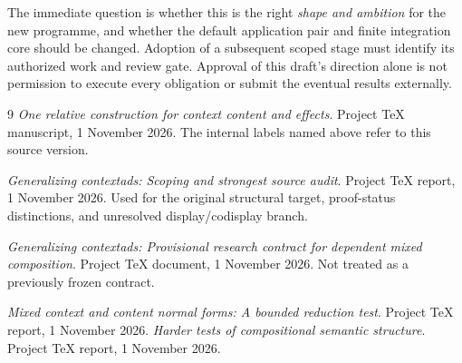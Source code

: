 \documentclass[11pt,a4paper]{article}
\begin{document}
The immediate question is whether this is the right \emph{shape and ambition}
for the new programme, and whether the default application pair and finite
integration core should be changed. Adoption of a subsequent scoped stage
must identify its authorized work and review gate. Approval of this draft's
direction alone is not permission to execute every obligation or submit the
eventual results externally.

\begin{thebibliography}{9}
\emph{One relative construction for context content and effects}.
Project TeX manuscript, 1 November 2026.
The internal labels named above refer to this source version.

\emph{Generalizing contextads: Scoping and strongest source audit}.
Project TeX report, 1 November 2026.
Used for the original structural target, proof-status distinctions, and
unresolved display/codisplay branch.

\emph{Generalizing contextads: Provisional research contract for dependent
mixed composition}.
Project TeX document, 1 November 2026.
Not treated as a previously frozen contract.

\emph{Mixed context and content normal forms: A bounded reduction test}.
Project TeX report, 1 November 2026.
\emph{Harder tests of compositional semantic structure}.
Project TeX report, 1 November 2026.
\end{thebibliography}
\end{document}

